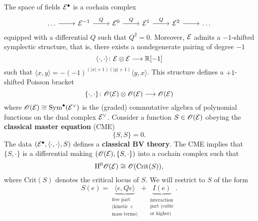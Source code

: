 The space of fields $\mathcal{E}^\bullet$ is a cochain complex
\begin{equation*}
  \begin{tikzcd}
    \dots \arrow[r] &
    \Ecal^{-1} \arrow[r, "Q"] &
    \Ecal^0 \arrow[r, "Q"] &
    \Ecal^1 \arrow[r, "Q"] &
    \Ecal^2 \arrow[r] &
    \dots
  \end{tikzcd}
\end{equation*}
equipped with a differential $Q$ such that $Q^2 = 0$. Moreover, $\mathcal{E}$ admits a $-1$-shifted symplectic structure, that is, there exists a nondegenerate pairing of degree $-1$
\begin{equation*}
  \langle \cdot , \cdot \rangle \colon
  \mathcal{E} \otimes \mathcal{E} \longrightarrow \mathbb{R} [-1]
\end{equation*}
such that $\langle x, y \rangle = -(-1)^{(|x|+1)(|y|+1)} \langle y, x \rangle$.
This structure defines a $+1$-shifted Poisson bracket
\begin{equation*}
  \{ \cdot, \cdot \} \colon
  \mathscr{O}( \mathcal{E} ) \otimes \mathscr{O}( \mathcal{E} ) \longrightarrow \mathscr{O}( \mathcal{E} )
\end{equation*}
where $\mathscr{O} ( \mathcal{E} ) \cong \mathrm{Sym}^\bullet (\mathcal{E}^\vee)$ is the (graded) commutative algebra of polynomial functions on the dual complex $\mathcal{E}^\vee$.
Consider a function $S \in \mathscr{O} (\mathcal{E})$ obeying the \textbf{classical master equation} (CME)
\begin{equation*}
  \{ S, S \} = 0.
\end{equation*}
The data $(\mathcal{E}^\bullet, \langle \cdot, \cdot \rangle, S)$ defines a \textbf{classical BV theory}.
The CME implies that $\{ S, \cdot \}$ is a differential making $(\mathscr{O} ( \mathcal{E} ), \{S, \cdot \} )$ into a cochain complex such that
\begin{equation*}
  \mathrm{H}^0 \mathscr{O} ( \mathcal{E} ) \cong
  \mathscr{O}( \mathrm{Crit} (S) ),
\end{equation*}
where $\mathrm{Crit} (S)$ denotes the critical locus of $S$.
We will restrict to $S$ of the form
\begin{equation*}
S(e) = \underbrace{\langle e, Qe \rangle}_{\substack{ \text{free part} \\ \text{(kinetic +} \\ \text{mass terms)} }}
+ \underbrace{I(e)}_{\substack{ \text{interaction} \\ \text{part (cubic} \\ \text{or higher)} }}.
\end{equation*}

